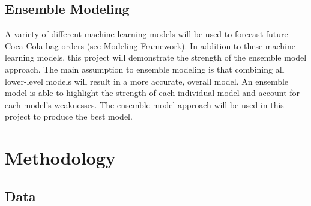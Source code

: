 \documentclass[12pt,oneside]{chicagocapstone}
\begin{document}
\hypertarget{ensemble-modeling}{%
\section*{Ensemble Modeling}\label{ensemble-modeling}}

A variety of different machine learning models will be used to forecast future Coca-Cola bag orders (see Modeling Framework). In addition to these machine learning models, this project will demonstrate the strength of the ensemble model approach. The main assumption to ensemble modeling is that combining all lower-level models will result in a more accurate, overall model. An ensemble model is able to highlight the strength of each individual model and account for each model's weaknesses. The ensemble model approach will be used in this project to produce the best model.

\newpage

\hypertarget{methodology}{%
\chapter*{Methodology}\label{methodology}}

\hypertarget{methodology-data}{%
\section*{Data}\label{methodology-data}}
\end{document}
